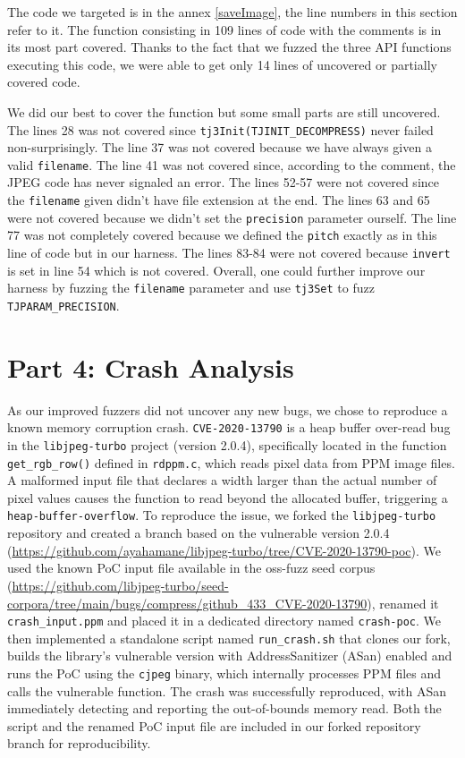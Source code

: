 \documentclass[12pt]{article}
\begin{document}
\noindent The code we targeted is in the annex \ref{saveImage}, the line numbers in this section refer to it. The function consisting in 109 lines of code with the comments is in its most part covered. Thanks to the fact that we fuzzed the three API functions executing this code, we were able to get only 14 lines of uncovered or partially covered code.

\noindent We did our best to cover the function but some small parts are still uncovered. The lines 28 was not covered since \texttt{tj3Init(TJINIT\_DECOMPRESS)} never failed non-surprisingly. The line 37 was not covered because we have always given a valid \texttt{filename}. The line 41 was not covered since, according to the comment, the JPEG code has never signaled an error. The lines 52-57 were not covered since the \texttt{filename} given didn't have file extension at the end. The lines 63 and 65 were not covered because we didn't set the \texttt{precision} parameter ourself. The line 77 was not completely covered because we defined the \texttt{pitch} exactly as in this line of code but in our harness. The lines 83-84 were not covered because \texttt{invert} is set in line 54 which is not covered. Overall, one could further improve our harness by fuzzing the \texttt{filename} parameter and use \texttt{tj3Set} to fuzz \texttt{TJPARAM\_PRECISION}.\\

\section{Part 4: Crash Analysis}
\noindent As our improved fuzzers did not uncover any new bugs, we chose to reproduce a known memory corruption crash. \texttt{CVE-2020-13790} is a heap buffer over-read bug in the \texttt{libjpeg-turbo} project (version 2.0.4), specifically located in the function \texttt{get\_rgb\_row()} defined in \texttt{rdppm.c}, which reads pixel data from PPM image files. A malformed input file that declares a width larger than the actual number of pixel values causes the function to read beyond the allocated buffer, triggering a \texttt{heap-buffer-overflow}. To reproduce the issue, we forked the \texttt{libjpeg-turbo} repository and created a branch based on the vulnerable version 2.0.4 (\url{https://github.com/ayahamane/libjpeg-turbo/tree/CVE-2020-13790-poc}). We used the known PoC input file available in the oss-fuzz seed corpus (\url{https://github.com/libjpeg-turbo/seed-corpora/tree/main/bugs/compress/github_433_CVE-2020-13790}), renamed it \texttt{crash\_input.ppm} and placed it in a dedicated directory named \texttt{crash-poc}. We then implemented a standalone script named \texttt{run\_crash.sh} that clones our fork, builds the library's vulnerable version with AddressSanitizer (ASan) enabled and runs the PoC using the \texttt{cjpeg} binary, which internally processes PPM files and calls the vulnerable function. The crash was successfully reproduced, with ASan immediately detecting and reporting the out-of-bounds memory read. Both the script and the renamed PoC input file are included in our forked repository branch for reproducibility.\\
\end{document}
